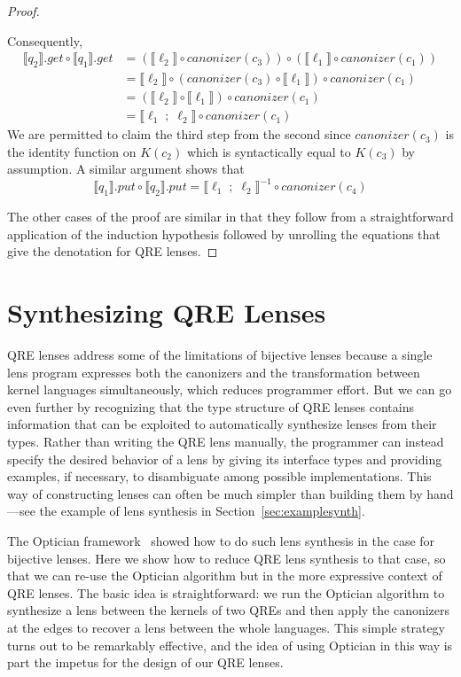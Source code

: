 \documentclass[acmsmall,review,anonymous]{acmart}
\newcommand{\kw}[1]{\ensuremath{\mathit{#1}}}
\newcommand{\canonizer}{\ensuremath{\kw{canonizer}}}
\newcommand{\get}{\ensuremath{\kw{get}}}
\newcommand{\lput}{\ensuremath{\kw{put}}}
\begin{document}
\begin{proof}
\begin{center}
\end{center}

Consequently,
\begin{align*}
\llbracket q_2 \rrbracket.\get \circ \llbracket q_1 \rrbracket.\get &=
(\llbracket \ell_2 \rrbracket \circ \canonizer(c_3)) \circ (\llbracket \ell_1
\rrbracket \circ \canonizer(c_1))\\
&= \llbracket \ell_2 \rrbracket \circ (\canonizer(c_3) \circ \llbracket \ell_1
\rrbracket) \circ \canonizer(c_1)\\
&= (\llbracket \ell_2 \rrbracket \circ \llbracket \ell_1 \rrbracket) \circ
\canonizer(c_1)\\
&= \llbracket \ell_1 \; ; \; \ell_2 \rrbracket \circ \canonizer(c_1)
\end{align*}
We are permitted to claim the third step from the second since
$\canonizer(c_3)$ is the identity function on $K(c_2)$ which is
syntactically equal to $K(c_3)$ by assumption. A similar argument shows that
$$\llbracket q_1 \rrbracket.\lput \circ \llbracket q_2 \rrbracket.\lput =
\llbracket \ell_1 \; ; \; \ell_2 \rrbracket^{-1} \circ
\canonizer(c_4)$$

The other cases of the proof are similar in that they follow from a
straightforward application of the induction hypothesis followed by unrolling
the equations that give the denotation for QRE lenses.
\end{proof}

\section{Synthesizing QRE Lenses}
\label{synth}

QRE lenses address some of the limitations of bijective lenses because a single
lens program expresses both the canonizers and the transformation between kernel
languages simultaneously, which reduces programmer effort.  But we can go even
further by recognizing that the type structure of QRE lenses contains
information that can be exploited to automatically synthesize lenses from their
types.  Rather than writing the QRE lens manually, the programmer can instead
specify the desired behavior of a lens by giving its interface types and providing
examples, if necessary, to disambiguate among possible implementations.  This
way of constructing lenses can often be much simpler than building them by
hand---see the example of lens synthesis in
Section~\ref{sec:examplesynth}.

The Optician framework~\cite{optician} showed how to do such lens synthesis in
the case for bijective lenses. Here we show how to reduce QRE lens synthesis to
that case, so that we can re-use the Optician algorithm but in the more
expressive context of QRE lenses.  The basic idea is straightforward: we run the
Optician algorithm to synthesize a lens between the kernels of two QREs and then
apply the canonizers at the edges to recover a lens between the whole
languages.  This simple strategy turns out to be remarkably effective, and the
idea of using Optician in this way is part the impetus for the design of our QRE
lenses.  
\end{document}
